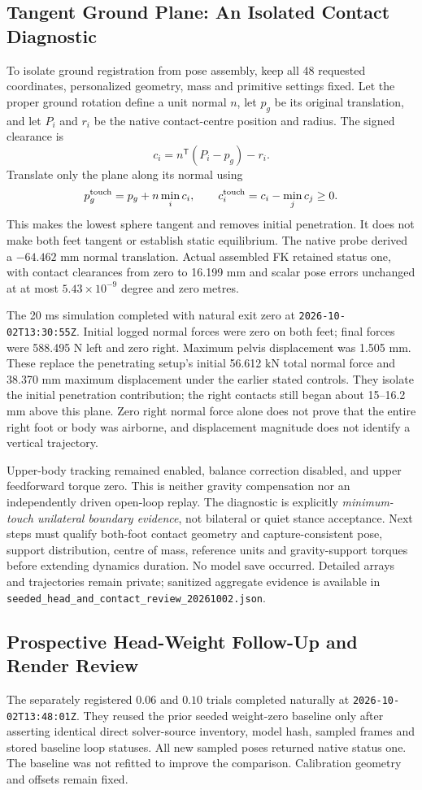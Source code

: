 \documentclass[11pt,a4paper]{article}
\begin{document}
\subsection{Tangent Ground Plane: An Isolated Contact Diagnostic}
To isolate ground registration from pose assembly, keep all 48 requested
coordinates, personalized geometry, mass and primitive settings fixed.
Let the proper ground rotation define a unit normal $n$, let $p_g$ be its
original translation, and let $P_i$ and $r_i$ be the native contact-centre
position and radius. The signed clearance is
\[
 c_i=n^{\mathsf T}(P_i-p_g)-r_i.
\]
Translate only the plane along its normal using
\[
 p_g^{\rm touch}=p_g+n\min_i c_i,
 \qquad c_i^{\rm touch}=c_i-\min_j c_j\geq0.
\]
This makes the lowest sphere tangent and removes initial penetration. It
does not make both feet tangent or establish static equilibrium. The native
probe derived a $-64.462$ mm normal translation. Actual assembled FK retained
status one, with contact clearances from zero to 16.199 mm and scalar pose
errors unchanged at at most $5.43\times10^{-9}$ degree and zero metres.

The 20 ms simulation completed with natural exit zero at
\texttt{2026-10-02T13:30:55Z}. Initial logged normal forces were zero on both
feet; final forces were 588.495 N left and zero right. Maximum pelvis
displacement was 1.505 mm. These replace the penetrating setup's initial
56.612 kN total normal force and 38.370 mm maximum displacement under the
earlier stated controls. They isolate the initial penetration contribution;
the right contacts still began about 15--16.2 mm above this plane. Zero right
normal force alone does not prove that the entire right foot or body was
airborne, and displacement magnitude does not identify a vertical trajectory.

Upper-body tracking remained enabled, balance correction disabled, and upper
feedforward torque zero. This is neither gravity compensation nor an
independently driven open-loop replay. The diagnostic is explicitly
\emph{minimum-touch unilateral boundary evidence}, not bilateral or quiet
stance acceptance. Next steps must qualify both-foot contact geometry and
capture-consistent pose, support distribution, centre of mass, reference
units and gravity-support torques before extending dynamics duration.
No model save occurred. Detailed arrays and trajectories remain private;
sanitized aggregate evidence is available in
\texttt{seeded\_head\_and\_contact\_review\_20261002.json}.


\subsection{Prospective Head-Weight Follow-Up and Render Review}
The separately registered $0.06$ and $0.10$ trials completed naturally at
\texttt{2026-10-02T13:48:01Z}. They reused the prior seeded weight-zero
baseline only after asserting identical direct solver-source inventory,
model hash, sampled frames and stored baseline loop statuses. All new
sampled poses returned native status one. The baseline was not refitted to
improve the comparison. Calibration geometry and offsets remain fixed.
\end{document}
